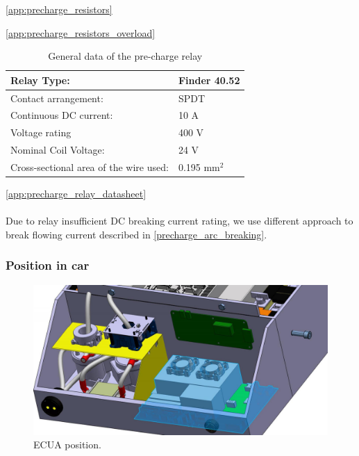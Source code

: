 \ref{app:precharge_resistors}

\ref{app:precharge_resistors_overload}


\begin{table}[H]
	\centering
	\caption{General data of the pre-charge relay}
	\begin{tabu}{|X|X|}
		\hline
		Relay Type: & Finder 40.52\\
		\hline
		Contact arrangement: &  SPDT \\
		\hline
		Continuous DC current:  & 10 A\\
		\hline
		Voltage rating  & 400 V\\
		\hline
		Nominal Coil Voltage: & 24 V \\
		\hline
		Cross-sectional area of the wire used: & 0.195 mm$^2$ \\
		\hline
	\end{tabu}%
	\label{tab:precharge-relay}%
\end{table}%

\ref{app:precharge_relay_datasheet}
\\\\
Due to relay insufficient DC breaking current rating, we use different approach to break flowing current described in \ref{precharge_arc_breaking}.

\subsubsection{Position in car}

\begin{figure}[H]
	\centering
	\includegraphics[width=\textwidth]{./img/ECUA_POSITION.jpg}
	\caption{ECUA position.}
	\label{fig:ECUA}
\end{figure}